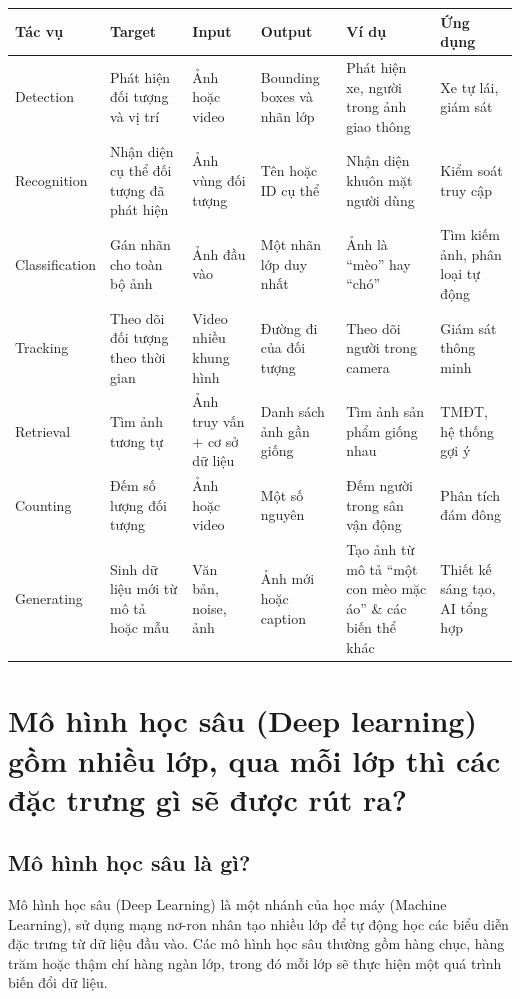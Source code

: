 \documentclass[12pt]{article}
\begin{document}
	\begin{tabularx}{\textwidth}{|>{\raggedright\arraybackslash}X
	|>{\raggedright\arraybackslash}X
	|>{\raggedright\arraybackslash}X
	|>{\raggedright\arraybackslash}X
	|>{\raggedright\arraybackslash}X
	|>{\raggedright\arraybackslash}X|}
	\hline
	\textbf{Tác vụ} & \textbf{Target} & \textbf{Input} & \textbf{Output} & \textbf{Ví dụ} & \textbf{Ứng dụng} \\
	\hline
	Detection & Phát hiện đối tượng và vị trí & Ảnh hoặc video & Bounding boxes và nhãn lớp & Phát hiện xe, người trong ảnh giao thông & Xe tự lái, giám sát \\
	\hline
	Recognition & Nhận diện cụ thể đối tượng đã phát hiện & Ảnh vùng đối tượng & Tên hoặc ID cụ thể & Nhận diện khuôn mặt người dùng & Kiểm soát truy cập \\
	\hline
	Classification & Gán nhãn cho toàn bộ ảnh & Ảnh đầu vào & Một nhãn lớp duy nhất & Ảnh là ``mèo'' hay ``chó'' & Tìm kiếm ảnh, phân loại tự động \\
	\hline
	Tracking & Theo dõi đối tượng theo thời gian & Video nhiều khung hình & Đường đi của đối tượng & Theo dõi người trong camera & Giám sát thông minh \\
	\hline
	Retrieval & Tìm ảnh tương tự & Ảnh truy vấn + cơ sở dữ liệu & Danh sách ảnh gần giống & Tìm ảnh sản phẩm giống nhau & TMĐT, hệ thống gợi ý \\
	\hline
	Counting & Đếm số lượng đối tượng & Ảnh hoặc video & Một số nguyên & Đếm người trong sân vận động & Phân tích đám đông \\
	\hline
	Generating & Sinh dữ liệu mới từ mô tả hoặc mẫu & Văn bản, noise, ảnh & Ảnh mới hoặc caption & Tạo ảnh từ mô tả ``một con mèo mặc áo'' \& các biến thể khác & Thiết kế sáng tạo, AI tổng hợp \\
	\hline
	\end{tabularx}
	
	\section{Mô hình học sâu (Deep learning) gồm nhiều lớp, qua mỗi lớp thì các đặc trưng gì sẽ được rút ra?}
	
	\subsection{Mô hình học sâu là gì?}
	
	Mô hình học sâu (Deep Learning) là một nhánh của học máy (Machine Learning), sử dụng mạng nơ-ron nhân tạo nhiều lớp để tự động học các biểu diễn đặc trưng từ dữ liệu đầu vào. Các mô hình học sâu thường gồm hàng chục, hàng trăm hoặc thậm chí hàng ngàn lớp, trong đó mỗi lớp sẽ thực hiện một quá trình biến đổi dữ liệu.
	
\end{document}
